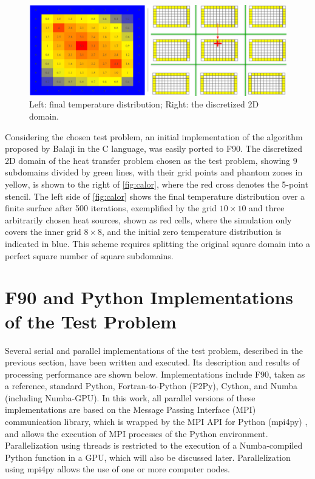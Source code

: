 \documentclass[12pt]{article}
\begin{document}
\begin{figure}[ht]
    \centering
    \includegraphics[width=\linewidth]{img/calomalhtran}
    \caption{Left: final temperature distribution; Right: the discretized 2D domain.}
    \label{fig:calor}
\end{figure}

Considering the chosen test problem, an initial implementation of the algorithm proposed by Balaji \cite{Balaji2017} in the C language, was easily ported to F90. The discretized 2D domain of the heat transfer problem chosen as the test problem, showing 9 subdomains divided by green lines, with their grid points and phantom zones in yellow, is shown to the right of \autoref{fig:calor}, where the red cross denotes the 5-point stencil. The left side of \autoref{fig:calor} shows the final temperature distribution over a finite surface after 500 iterations, exemplified by the grid $ 10 \times 10 $ and three arbitrarily chosen heat sources, shown as red cells, where the simulation only covers the inner grid $ 8 \times 8 $, and the initial zero temperature distribution is indicated in blue. This scheme requires splitting the original square domain into a perfect square number of square subdomains.









\section{F90 and Python Implementations of the Test Problem}
\label{sec:implementacoes}

Several serial and parallel implementations of the test problem, described in the previous section, have been written and executed. Its description and results of processing performance are shown below. Implementations include F90, taken as a reference, standard Python, Fortran-to-Python (F2Py), Cython, and Numba (including Numba-GPU). In this work, all parallel versions of these implementations are based on the Message Passing Interface (MPI) communication library, which is wrapped by the MPI API for Python (mpi4py) \cite{Mpi4py2020}, and allows the execution of MPI processes of the Python environment. Parallelization using threads is restricted to the execution of a  Numba-compiled Python function in a GPU, which will also be discussed later. Parallelization using mpi4py allows the use of one or more computer nodes.
\end{document}
